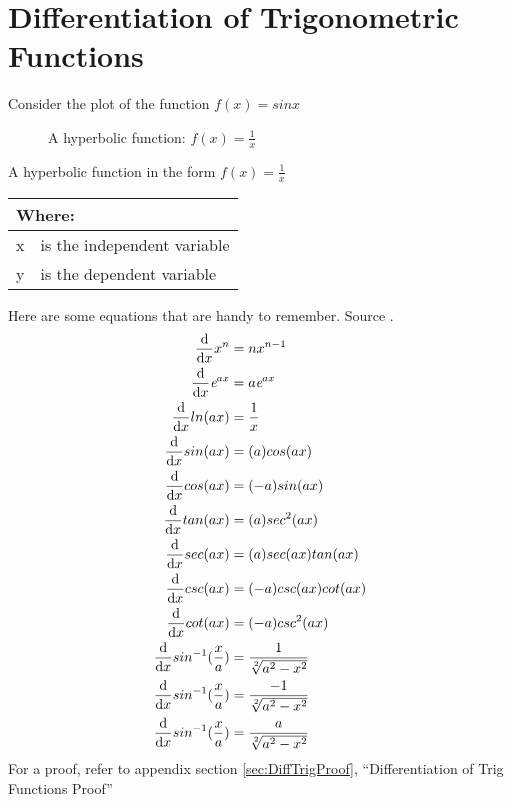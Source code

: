 \chapter{Differentiation of Trigonometric Functions}
\label{chap:DifferentiationOfTrigFunctions}
Consider the plot of the function $f(x) = sinx$
\begin{figure}[!htb]
\label{fig:GraphTemplate}
\caption{A hyperbolic function: $f(x) = \frac{1}{x}$}
\end{figure}
A hyperbolic function in the form $ f(x) = \frac{1}{x}$
\begin{table}[!hbt]
\label{tab:GraphTemplateParts}
\begin{tabularx}{\linewidth}{| l X |}
  \hline
  \multicolumn{2}{|l|}{Where:} \\
  \hline \hline
  x & is the independent variable\\
  y & is the dependent variable\\
\hline
\end{tabularx}
\end{table}
%
Here are some equations that are handy to remember. Source \cite{RHBDiffQuickStart}.
\begin{align}
  \frac{\mathrm{d}}{\mathrm{d}x} {x}^{n} & = n{x}^{n-1} \\
  \frac{\mathrm{d}}{\mathrm{d}x} {\emph{e}}^{ax} & = a{\emph{e}}^{ax} \\
  \frac{\mathrm{d}}{\mathrm{d}x} ln(ax) & = \frac{1}{x} \\
  \frac{\mathrm{d}}{\mathrm{d}x} sin(ax) & = (a)cos(ax) \\
  \frac{\mathrm{d}}{\mathrm{d}x} cos(ax) & = (-a)sin(ax) \\
  \frac{\mathrm{d}}{\mathrm{d}x} tan(ax) & = (a){sec}^{2}(ax) \\
  \frac{\mathrm{d}}{\mathrm{d}x} sec(ax) & = (a)sec(ax)tan(ax) \\
  \frac{\mathrm{d}}{\mathrm{d}x} csc(ax) & = (-a)csc(ax)cot(ax) \\
  \frac{\mathrm{d}}{\mathrm{d}x} cot(ax) & = (-a){csc}^{2}(ax) \\
  \frac{\mathrm{d}}{\mathrm{d}x} {sin}^{-1}(\frac{x}{a}) & = \frac{1}{\sqrt[2]{{a}^{2} - {x}^{2}}}
  \\
  \frac{\mathrm{d}}{\mathrm{d}x} {sin}^{-1}(\frac{x}{a}) & = \frac{-1}{\sqrt[2]{{a}^{2} - {x}^{2}}}
  \\
  \frac{\mathrm{d}}{\mathrm{d}x} {sin}^{-1}(\frac{x}{a}) & = \frac{a}{\sqrt[2]{{a}^{2} - {x}^{2}}}  
\end{align}
For a proof, refer to appendix section \ref{sec:DiffTrigProof},
``Differentiation of Trig Functions Proof''